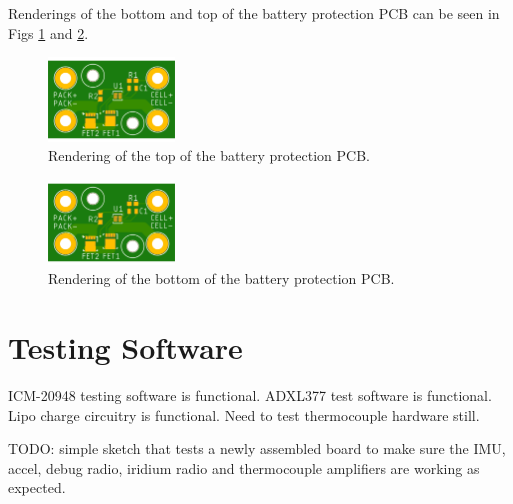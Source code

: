 \documentclass{article}
\begin{document}
Renderings of the bottom and top of the battery protection PCB can be seen in Figs \ref{fig:bat-top} and \ref{fig:bat-bottom}.


\begin{figure}[H]
    \centering
    \includegraphics[width=0.3\textwidth]{images/BatteryProtection-render-top.png}
    \caption{Rendering of the top of the battery protection PCB.}
    \label{fig:bat-top}
\end{figure}


\begin{figure}[H]
    \centering
    \includegraphics[width=0.3\textwidth]{images/BatteryProtection-render-top.png}
    \caption{Rendering of the bottom of the battery protection PCB.}
    \label{fig:bat-bottom}
\end{figure}

\section{Testing Software}

ICM-20948 testing software is functional. ADXL377 test software is functional. Lipo charge circuitry is functional. Need to test thermocouple hardware still.

TODO: simple sketch that tests a newly assembled board to make sure the IMU, accel, debug radio, iridium radio and thermocouple amplifiers are working as expected. 
\end{document}
